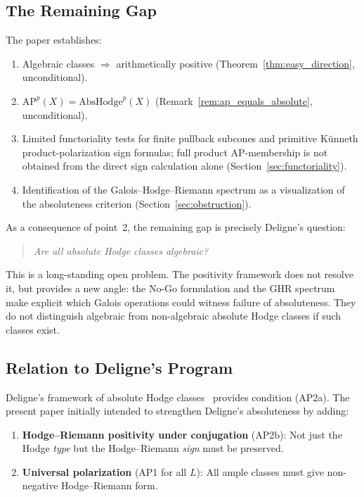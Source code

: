 \documentclass[aps,prd,twocolumn,superscriptaddress,nofootinbib]{revtex4-2}
\theoremstyle{definition}
\theoremstyle{remark}
\begin{document}
\subsection{The Remaining Gap}

The paper establishes:
\begin{enumerate}
\item Algebraic classes $\Rightarrow$ arithmetically positive (Theorem~\ref{thm:easy_direction}, unconditional).
\item $\mathrm{AP}^p(X) = \mathrm{AbsHodge}^p(X)$ (Remark~\ref{rem:ap_equals_absolute}, unconditional).
\item Limited functoriality tests for finite pullback subcones and primitive Künneth product-polarization sign formulas; full product AP-membership is not obtained from the direct sign calculation alone (Section~\ref{sec:functoriality}).
\item Identification of the Galois--Hodge--Riemann spectrum as a visualization of the absoluteness criterion (Section~\ref{sec:obstruction}).
\end{enumerate}

As a consequence of point~2, the remaining gap is precisely Deligne's question:

\begin{quote}
\textit{Are all absolute Hodge classes algebraic?}
\end{quote}

This is a long-standing open problem. The positivity framework does not resolve it, but provides a new angle: the No-Go formulation and the GHR spectrum make explicit which Galois operations could witness failure of absoluteness. They do not distinguish algebraic from non-algebraic absolute Hodge classes if such classes exist.

\subsection{Relation to Deligne's Program}

Deligne's framework of absolute Hodge classes~\cite{Deligne1982} provides condition (AP2a). The present paper initially intended to strengthen Deligne's absoluteness by adding:

\begin{enumerate}
\item \textbf{Hodge--Riemann positivity under conjugation} (AP2b): Not just the Hodge \textit{type} but the Hodge--Riemann \textit{sign} must be preserved.

\item \textbf{Universal polarization} (AP1 for all $L$): All ample classes must give non-negative Hodge--Riemann form.
\end{enumerate}
\end{document}
